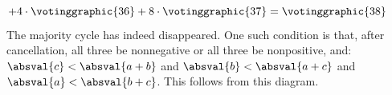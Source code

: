 \begin{ans}{4}
\begin{exparts}
\begin{equation*}
         +4\cdot\votinggraphic{36}
         +8\cdot\votinggraphic{37}
         =\votinggraphic{38}
       \tag*{}\end{equation*}
       The majority cycle has indeed disappeared.
      \partsitem One such condition is that, after cancellation,
         all three be nonnegative or all three be nonpositive,
         and:~$\absval{c}<\absval{a+b}$ and $\absval{b}<\absval{a+c}$
         and $\absval{a}<\absval{b+c}$.
          This follows from this diagram.
         \begin{equation*}

\end{equation*}
\end{exparts}
\end{ans}
